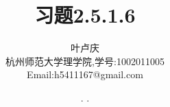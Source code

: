 \documentclass[a4paper, 12pt]{article} %
\makeatletter
\renewcommand{\maketitle}{ %
  \renewcommand\refname{参考文献}
  \newcommand{\D}{\displaystyle}\newcommand{\ri}{\Rightarrow}
  \newcommand{\ds}{\displaystyle} \renewcommand{\ni}{\noindent}
  \newcommand{\pa}{\partial} \newcommand{\Om}{\Omega}
  \newcommand{\om}{\omega} \newcommand{\sik}{\sum_{i=1}^k}
  \newcommand{\vov}{\Vert\omega\Vert} \newcommand{\Umy}{U_{\mu_i,y^i}}
  \newcommand{\lamns}{\lambda_n^{^{\scriptstyle\sigma}}}
  \newcommand{\chiomn}{\chi_{_{\Omega_n}}}
  \newcommand{\ullim}{\underline{\lim}} \newcommand{\bsy}{\boldsymbol}
  \newcommand{\mvb}{\mathversion{bold}} \newcommand{\la}{\lambda}
  \newcommand{\La}{\Lambda} \newcommand{\va}{\varepsilon}
  \newcommand{\be}{\beta} \newcommand{\al}{\alpha}
  \newcommand{\dis}{\displaystyle} \newcommand{\R}{{\mathbb R}}
  \newcommand{\N}{{\mathbb N}} \newcommand{\cF}{{\mathcal F}}
  \newcommand{\gB}{{\mathfrak B}} \newcommand{\eps}{\epsilon}
  \begin{flushright} %
    {\LARGE\@title} %
    
    \vspace{50pt} %
    
    {\large\@author} %
    \\\@date %
    
    \vspace{40pt} %
  \end{flushright}
}
\makeatother
\begin{document}
\title{\textbf{习题2.5.1.6}} 
\author{\small{叶卢庆}\\{\small{杭州师范大学理学院,学号:1002011005}}\\{\small{Email:h5411167@gmail.com}}} %
\renewcommand{\today}{\number\year. \number\month. \number\day}
\date{\today} %



\maketitle %






\end{document}
